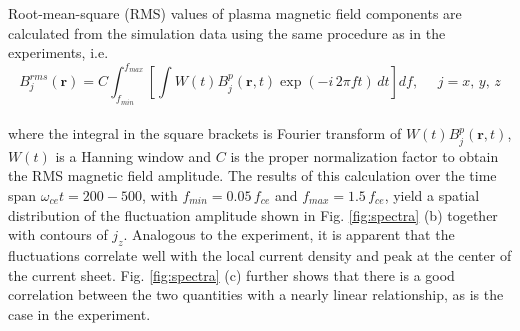 \documentclass[aip,preprint]{revtex4-1}
\begin{document}
Root-mean-square (RMS) values of plasma magnetic field components  are calculated from the simulation data using the same procedure as in the experiments, i.e.
\begin{equation}
{B}_j^{rms}(\mathbf{r}) = C\int_{f_{min}}^{f_{max}}
\left[ \int W(t) B_j^{p}(\mathbf{r},t)\exp(-i\,2\pi f t)\, dt\right]df, \,\,\,\,\,\,\,\, j=x,\, y,\, z
\end{equation}
\\
where the integral in the square brackets is  Fourier transform of $W(t)B_j^{p}(\mathbf{r},t)$,  $W(t)$ is a Hanning window and $C$ is the proper normalization factor to obtain the RMS magnetic field amplitude.
The results of this calculation over the time span $\omega_{ce}t=200-500$, with $f_{min}=0.05\,f_{ce}$ and $f_{max}=1.5\,f_{ce}$, yield a  spatial distribution of the fluctuation amplitude shown in Fig. \ref{fig:spectra} (b) together with contours of $j_z$. Analogous to the experiment, it is apparent that the fluctuations correlate well with the local current density and peak at the center of the current sheet. Fig. \ref{fig:spectra} (c) further shows that there is a good correlation between the two quantities with a nearly linear relationship, as is the case in the experiment.
\end{document}
